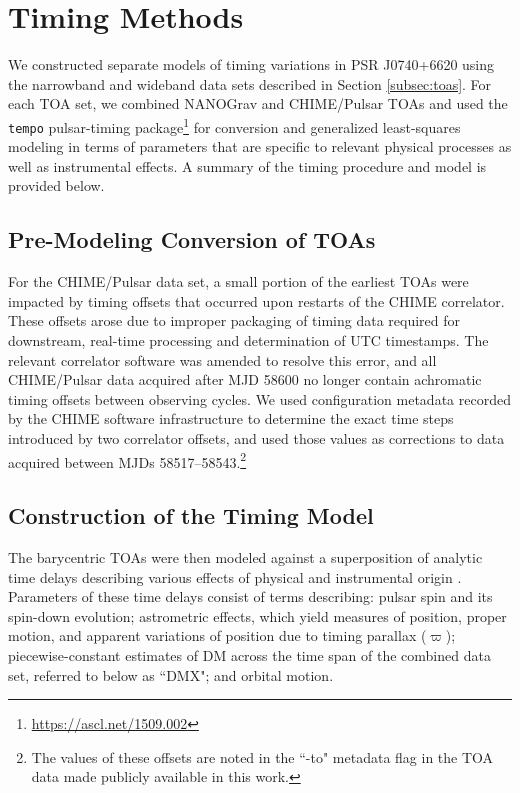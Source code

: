 \documentclass[twocolumn]{aastex63}
\newcommand{\chimepsr}{CHIME/Pulsar}
\newcommand{\tempo}{{\tt tempo}}
\begin{document}
\section{Timing Methods}
\label{sec:method}
We constructed separate models of timing variations in PSR J0740+6620 using the narrowband and wideband data sets described in Section \ref{subsec:toas}. For each TOA set, we combined NANOGrav and \chimepsr{} TOAs and used the \tempo{} pulsar-timing package\footnote{\url{https://ascl.net/1509.002}} for conversion and generalized least-squares modeling \citep{chc+11} in terms of parameters that are specific to relevant physical processes as well as instrumental effects. A summary of the timing procedure and model is provided below.

\subsection{Pre-Modeling Conversion of TOAs}
For the \chimepsr{} data set, a small portion of the earliest TOAs were impacted by timing offsets that occurred upon restarts of the CHIME correlator. These offsets arose due to improper packaging of timing data required for downstream, real-time processing and determination of UTC timestamps. The relevant correlator software was amended to resolve this error, and all \chimepsr{} data acquired after MJD 58600 no longer contain achromatic timing offsets between observing cycles. We used configuration metadata recorded by the CHIME software infrastructure to determine the exact time steps introduced by two correlator offsets, and used those values as corrections to data acquired between MJDs 58517--58543.\footnote{The values of these offsets are noted in the ``-to" metadata flag in the TOA data made publicly available in this work.}

\subsection{Construction of the Timing Model}

The barycentric TOAs were then modeled against a superposition of analytic time delays describing various effects of physical and instrumental origin \citep[e.g.,][]{bh86}. Parameters of these time delays consist of terms describing: pulsar spin and its spin-down evolution; astrometric effects, which yield measures of position, proper motion, and apparent variations of position due to timing parallax ($\varpi$); piecewise-constant estimates of DM across the time span of the combined data set, referred to below as ``DMX"; and orbital motion.
\end{document}
